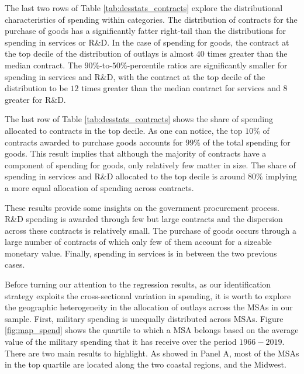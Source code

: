 \documentclass[dv_diss_main.tex]{subfiles}
\begin{document}
The last two rows of Table \ref{tab:desstats_contracts} explore the distributional characteristics of spending within categories. The distribution of contracts for the purchase of goods has a significantly fatter right-tail than the distributions for spending in services or R\&D. In the case of spending for goods, the contract at the top decile of the distribution of outlays is almost $40$ times greater than the median contract. The $90\%$-to-$50\%$-percentile ratios are significantly smaller for spending in services and R\&D, with the contract at the top decile of the distribution to be $12$ times greater than the median contract for services and $8$ greater for R\&D. 

The last row of Table \ref{tab:desstats_contracts} shows the share of spending allocated to contracts in the top decile. As one can notice, the top $10\%$ of contracts awarded to purchase goods accounts for $99\%$ of the total spending for goods. This result implies that although the majority of contracts have a component of spending for goods, only relatively few matter in size. The share of spending in services and R\&D allocated to the top decile is around $80\%$ implying a more equal allocation of spending across contracts.  

These results provide some insights on the government procurement process. R\&D spending is awarded through few but large contracts and the dispersion across these contracts is relatively small. The purchase of goods occurs through a large number of contracts of which only few of them account for a sizeable monetary value. Finally, spending in services is in between the two previous cases.

Before turning our attention to the regression results, as our identification strategy exploits the cross-sectional variation in spending, it is worth to explore the geographic heterogeneity in the allocation of outlays across the MSAs in our sample. First, military spending is unequally distributed across MSAs. Figure \ref{fig:map_spend} shows the quartile to which a MSA belongs based on the average value of the military spending that it has receive over the period $1966-2019$. There are two main results to highlight. As showed in Panel A, most of the MSAs in the top quartile are located along the two coastal regions, and the Midwest. 
\end{document}
